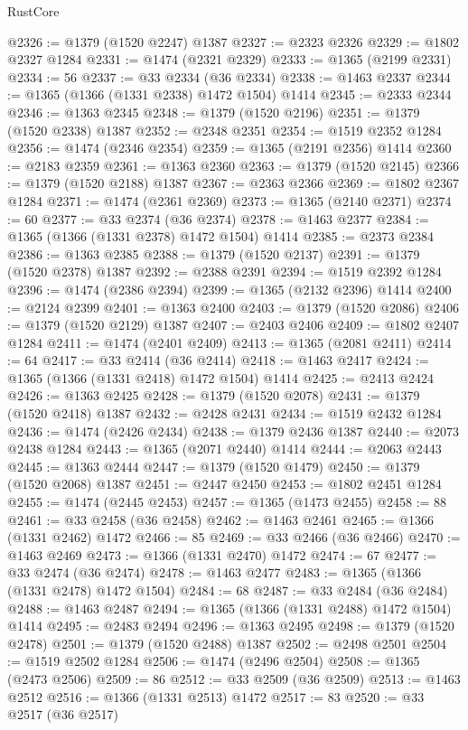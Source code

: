 \begin{lexlean}{RustCore}
\begin{coremodule}
@2326 := @1379 (@1520 @2247) @1387
@2327 := @2323 @2326
@2329 := @1802 @2327 @1284
@2331 := @1474 (@2321 @2329)
@2333 := @1365 (@2199 @2331)
@2334 := 56
@2337 := @33 @2334 (@36 @2334)
@2338 := @1463 @2337
@2344 := @1365 (@1366 (@1331 @2338) @1472 @1504) @1414
@2345 := @2333 @2344
@2346 := @1363 @2345
@2348 := @1379 (@1520 @2196)
@2351 := @1379 (@1520 @2338) @1387
@2352 := @2348 @2351
@2354 := @1519 @2352 @1284
@2356 := @1474 (@2346 @2354)
@2359 := @1365 (@2191 @2356) @1414
@2360 := @2183 @2359
@2361 := @1363 @2360
@2363 := @1379 (@1520 @2145)
@2366 := @1379 (@1520 @2188) @1387
@2367 := @2363 @2366
@2369 := @1802 @2367 @1284
@2371 := @1474 (@2361 @2369)
@2373 := @1365 (@2140 @2371)
@2374 := 60
@2377 := @33 @2374 (@36 @2374)
@2378 := @1463 @2377
@2384 := @1365 (@1366 (@1331 @2378) @1472 @1504) @1414
@2385 := @2373 @2384
@2386 := @1363 @2385
@2388 := @1379 (@1520 @2137)
@2391 := @1379 (@1520 @2378) @1387
@2392 := @2388 @2391
@2394 := @1519 @2392 @1284
@2396 := @1474 (@2386 @2394)
@2399 := @1365 (@2132 @2396) @1414
@2400 := @2124 @2399
@2401 := @1363 @2400
@2403 := @1379 (@1520 @2086)
@2406 := @1379 (@1520 @2129) @1387
@2407 := @2403 @2406
@2409 := @1802 @2407 @1284
@2411 := @1474 (@2401 @2409)
@2413 := @1365 (@2081 @2411)
@2414 := 64
@2417 := @33 @2414 (@36 @2414)
@2418 := @1463 @2417
@2424 := @1365 (@1366 (@1331 @2418) @1472 @1504) @1414
@2425 := @2413 @2424
@2426 := @1363 @2425
@2428 := @1379 (@1520 @2078)
@2431 := @1379 (@1520 @2418) @1387
@2432 := @2428 @2431
@2434 := @1519 @2432 @1284
@2436 := @1474 (@2426 @2434)
@2438 := @1379 @2436 @1387
@2440 := @2073 @2438 @1284
@2443 := @1365 (@2071 @2440) @1414
@2444 := @2063 @2443
@2445 := @1363 @2444
@2447 := @1379 (@1520 @1479)
@2450 := @1379 (@1520 @2068) @1387
@2451 := @2447 @2450
@2453 := @1802 @2451 @1284
@2455 := @1474 (@2445 @2453)
@2457 := @1365 (@1473 @2455)
@2458 := 88
@2461 := @33 @2458 (@36 @2458)
@2462 := @1463 @2461
@2465 := @1366 (@1331 @2462) @1472
@2466 := 85
@2469 := @33 @2466 (@36 @2466)
@2470 := @1463 @2469
@2473 := @1366 (@1331 @2470) @1472
@2474 := 67
@2477 := @33 @2474 (@36 @2474)
@2478 := @1463 @2477
@2483 := @1365 (@1366 (@1331 @2478) @1472 @1504)
@2484 := 68
@2487 := @33 @2484 (@36 @2484)
@2488 := @1463 @2487
@2494 := @1365 (@1366 (@1331 @2488) @1472 @1504) @1414
@2495 := @2483 @2494
@2496 := @1363 @2495
@2498 := @1379 (@1520 @2478)
@2501 := @1379 (@1520 @2488) @1387
@2502 := @2498 @2501
@2504 := @1519 @2502 @1284
@2506 := @1474 (@2496 @2504)
@2508 := @1365 (@2473 @2506)
@2509 := 86
@2512 := @33 @2509 (@36 @2509)
@2513 := @1463 @2512
@2516 := @1366 (@1331 @2513) @1472
@2517 := 83
@2520 := @33 @2517 (@36 @2517)

\end{coremodule}
\end{lexlean}
